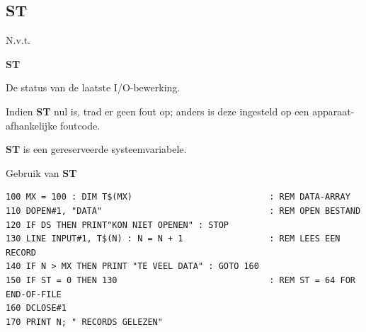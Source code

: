 \subsection{ST}
\begin{description}[leftmargin=2cm,style=nextline]
\item [Token:]    N.v.t.

\item [Formaat:]   {\bf ST}

\item [Gebruik:]    De status van de laatste I/O-bewerking.

                  Indien {\bf ST} nul is, trad er geen fout op; anders is deze ingesteld op een apparaat-afhankelijke foutcode.

\item [Opmerkingen:]  {\bf ST} is een gereserveerde systeemvariabele.

\item [Voorbeeld:]  Gebruik van {\bf ST}

\begin{tcolorbox}[colback=black,coltext=white]
\verbatimfont{\codefont}
\begin{verbatim}
100 MX = 100 : DIM T$(MX)                           : REM DATA-ARRAY
110 DOPEN#1, "DATA"                                 : REM OPEN BESTAND
120 IF DS THEN PRINT"KON NIET OPENEN" : STOP
130 LINE INPUT#1, T$(N) : N = N + 1                 : REM LEES EEN RECORD
140 IF N > MX THEN PRINT "TE VEEL DATA" : GOTO 160
150 IF ST = 0 THEN 130                              : REM ST = 64 FOR END-OF-FILE
160 DCLOSE#1
170 PRINT N; " RECORDS GELEZEN"
\end{verbatim}
\end{tcolorbox}
\end{description}


\newpage
